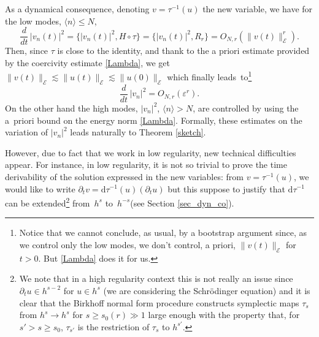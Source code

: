 As a dynamical consequence, denoting $v=\tau^{-1}(u)$ the new variable, we have for the low modes, $\langle n \rangle \leq N$,
\[
\frac{d}{dt}\,|v_n(t)|^2=\{|v_n(t)|^2,H\circ \tau\}=\{|v_n(t)|^2,R_r\}= O_{N,r}(\|v(t)\|_{\mathcal{E}}^r).
\]
Then, since $\tau$ is close to the identity, and
thank to the a priori estimate provided by the coercivity estimate \eqref{Lambda}, we get
$\|v(t)\|_{\mathcal{E}}\lesssim\|u(t)\|_{\mathcal{E}}\lesssim \|u(0)\|_{\mathcal{E}}$ which finally leads~to\footnote{Notice that we cannot conclude, as usual, by a bootstrap argument since, as we control only the low modes, we don't control, a priori, $\|v(t)\|_{\mathcal{E}}$ for $t>0$. But \eqref{Lambda} does it for us.}
\[
\frac{d}{dt}\,|v_n|^2=O_{N,r}(\varepsilon^r).
\]
On the other hand the high modes, $|v_n|^2$, $\langle n\rangle > N$, are controlled by using the a~priori bound on the energy norm \eqref{Lambda}. Formally, these estimates on the variation of $|v_n|^2$ leads naturally to Theorem \ref{sketch}.

However, due to fact that we work in low regularity, new technical difficulties appear. For instance, in low regularity, it is not so trivial to prove the time derivability of the solution expressed in the new variables: from $v=\tau^{-1}(u)$, we would like to write $\partial_t v= \mathrm{d}\tau^{-1}(u)(\partial_t u)$ but this suppose to justify that $\mathrm{d}\tau^{-1}$ can be extended\footnote{We note that in a high regularity context this is not really an issue since $\partial_t u \in h^{s-2}$ for $u\in h^s$ (we are considering the Schrödinger equation) and it is clear that the Birkhoff normal form procedure constructs symplectic maps $\tau_s$ from $h^s\to h^s$ for $s\geq s_0(r)\gg 1$ large enough with the property that, for $s'>s\geq s_0$, $\tau_{s'}$ is the restriction of $\tau_s$ to $h^{s'}$.} from~$h^s$ to~$h^{-s}$(see Section \ref{sec_dyn_co}).

